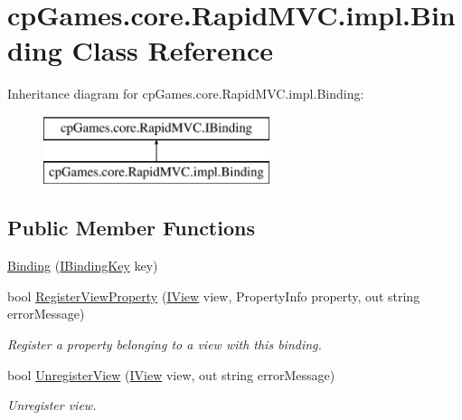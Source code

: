 \hypertarget{classcp_games_1_1core_1_1_rapid_m_v_c_1_1impl_1_1_binding}{}\section{cp\+Games.\+core.\+Rapid\+M\+V\+C.\+impl.\+Binding Class Reference}
\label{classcp_games_1_1core_1_1_rapid_m_v_c_1_1impl_1_1_binding}
Inheritance diagram for cp\+Games.\+core.\+Rapid\+M\+V\+C.\+impl.\+Binding\+:\begin{figure}[H]
\begin{center}
\leavevmode
\includegraphics[height=2.000000cm]{classcp_games_1_1core_1_1_rapid_m_v_c_1_1impl_1_1_binding}
\end{center}
\end{figure}
\subsection*{Public Member Functions}
\begin{DoxyCompactItemize}
\item 
\mbox{\hyperlink{classcp_games_1_1core_1_1_rapid_m_v_c_1_1impl_1_1_binding_aa53ebf2d17f246c0af5c6e4e4383ba54}{Binding}} (\mbox{\hyperlink{interfacecp_games_1_1core_1_1_rapid_m_v_c_1_1_i_binding_key}{I\+Binding\+Key}} key)
\item 
bool \mbox{\hyperlink{classcp_games_1_1core_1_1_rapid_m_v_c_1_1impl_1_1_binding_a3cfd038fdadb7a25cd3e37413c083049}{Register\+View\+Property}} (\mbox{\hyperlink{interfacecp_games_1_1core_1_1_rapid_m_v_c_1_1_i_view}{I\+View}} view, Property\+Info property, out string error\+Message)
\begin{DoxyCompactList}\small\item\em Register a property belonging to a view with this binding. \end{DoxyCompactList}\item 
bool \mbox{\hyperlink{classcp_games_1_1core_1_1_rapid_m_v_c_1_1impl_1_1_binding_ad7209adda2ba56a242f1016c877d0883}{Unregister\+View}} (\mbox{\hyperlink{interfacecp_games_1_1core_1_1_rapid_m_v_c_1_1_i_view}{I\+View}} view, out string error\+Message)
\begin{DoxyCompactList}\small\item\em Unregister view. \end{DoxyCompactList}\end{DoxyCompactItemize}
